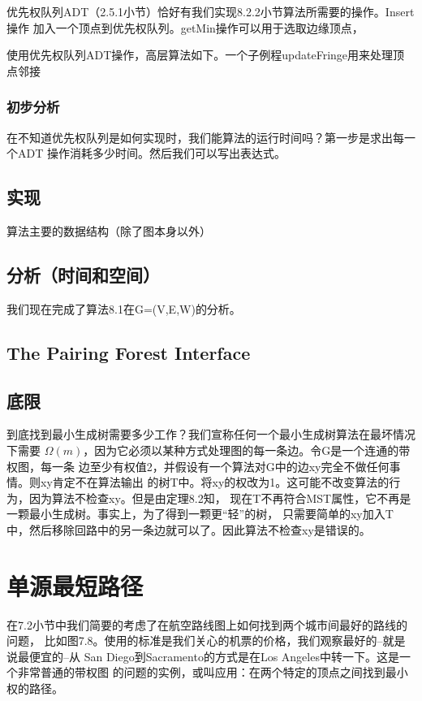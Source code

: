 优先权队列ADT（2.5.1小节）恰好有我们实现8.2.2小节算法所需要的操作。Insert操作
加入一个顶点到优先权队列。getMin操作可以用于选取边缘顶点，

使用优先权队列ADT操作，高层算法如下。一个子例程updateFringe用来处理顶点邻接

\subsubsection{初步分析}
在不知道优先权队列是如何实现时，我们能算法的运行时间吗？第一步是求出每一个ADT
操作消耗多少时间。然后我们可以写出表达式。

\subsection{实现}
算法主要的数据结构（除了图本身以外）
\subsection{分析（时间和空间）}
我们现在完成了算法8.1在G=(V,E,W)的分析。

\subsection{The Pairing Forest Interface}
\subsection{底限}
到底找到最小生成树需要多少工作？我们宣称任何一个最小生成树算法在最坏情况下需要
$\Omega(m)$，因为它必须以某种方式处理图的每一条边。令G是一个连通的带权图，每一条
边至少有权值2，并假设有一个算法对G中的边xy完全不做任何事情。则xy肯定不在算法输出
的树T中。将xy的权改为1。这可能不改变算法的行为，因为算法不检查xy。但是由定理8.2知，
现在T不再符合MST属性，它不再是一颗最小生成树。事实上，为了得到一颗更“轻”的树，
只需要简单的xy加入T中，然后移除回路中的另一条边就可以了。因此算法不检查xy是错误的。

\section{单源最短路径}\label{Sec:single-source-shortest-path}
在7.2小节中我们简要的考虑了在航空路线图上如何找到两个城市间最好的路线的问题，
比如图7.8。使用的标准是我们关心的机票的价格，我们观察最好的--就是说最便宜的--从
San Diego到Sacramento的方式是在Los Angeles中转一下。这是一个非常普通的带权图
的问题的实例，或叫应用：在两个特定的顶点之间找到最小权的路径。

